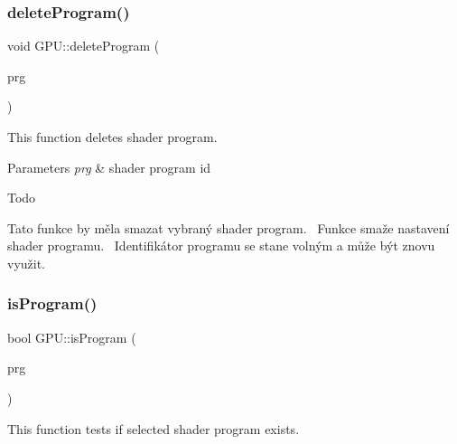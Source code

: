 \subsubsection{\texorpdfstring{delete\+Program()}{deleteProgram()}}
{\footnotesize\ttfamily void G\+P\+U\+::delete\+Program (\begin{DoxyParamCaption}\item[{\hyperlink{fwd_8hpp_a46ffd067c21ab50f5f1fcfed5d8bfc15}{Program\+ID}}]{prg }\end{DoxyParamCaption})}



This function deletes shader program. 


\begin{DoxyParams}{Parameters}
{\em prg} & shader program id \\
\hline
\end{DoxyParams}
\begin{DoxyRefDesc}{Todo}
\item[\hyperlink{todo__todo000018}{Todo}]Tato funkce by měla smazat vybraný shader program.~\newline
 Funkce smaže nastavení shader programu.~\newline
 Identifikátor programu se stane volným a může být znovu využit.~\newline
 \end{DoxyRefDesc}
\mbox{\label{group__program__tasks_ga481c0eb5be3150af401a58fa167506e0}} 
\subsubsection{\texorpdfstring{is\+Program()}{isProgram()}}
{\footnotesize\ttfamily bool G\+P\+U\+::is\+Program (\begin{DoxyParamCaption}\item[{\hyperlink{fwd_8hpp_a46ffd067c21ab50f5f1fcfed5d8bfc15}{Program\+ID}}]{prg }\end{DoxyParamCaption})}



This function tests if selected shader program exists. 


